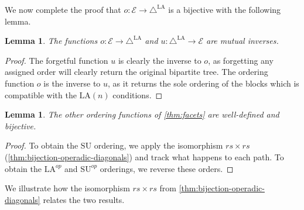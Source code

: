 \documentclass{amsart}
\newtheorem{lemma}[theorem]{Lemma}
\theoremstyle{definition}
\newcommand{\SU}{\mathrm{SU}}
\newcommand{\LA}{\mathrm{LA}}
\newcommand{\LAD}{\triangle^{\mathrm{LA}}}
\newcommand{\EC}{\mathcal{E}} %
\begin{document}
We now complete the proof that $o:\EC\to \LAD$ is a bijective with the following lemma.

\begin{lemma}\label{l:o and u inverses}
The functions $o:\EC\to \LAD$ and $u:\LAD \to \EC$ are mutual inverses.
\end{lemma}
\begin{proof}
The forgetful function $u$ is clearly the inverse to $o$, as forgetting any assigned order will clearly return the original bipartite tree. 
The ordering function $o$ is the inverse to $u$, as it returns the sole ordering of the blocks which is compatible with the $\LA(n)$ conditions.
\end{proof}

\begin{lemma} \label{l:Non LA ordering functions}
The other ordering functions of \cref{thm:facets} are well-defined and bijective.
\end{lemma}
\begin{proof}
To obtain the $\SU$ ordering, we apply the isomorphism $rs\times rs$ (\cref{thm:bijection-operadic-diagonals}) and track what happens to each path.
To obtain the $\LA^{op}$ and $\SU^{op}$ orderings, we reverse these orders.
\end{proof}

We illustrate how the isomorphism $rs\times rs$ from \cref{thm:bijection-operadic-diagonals} relates the two results.
\end{document}
